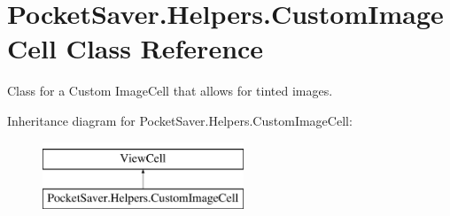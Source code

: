 \hypertarget{class_pocket_saver_1_1_helpers_1_1_custom_image_cell}{}\section{Pocket\+Saver.\+Helpers.\+Custom\+Image\+Cell Class Reference}
\label{class_pocket_saver_1_1_helpers_1_1_custom_image_cell}


Class for a Custom Image\+Cell that allows for tinted images.  


Inheritance diagram for Pocket\+Saver.\+Helpers.\+Custom\+Image\+Cell\+:\begin{figure}[H]
\begin{center}
\leavevmode
\includegraphics[height=2.000000cm]{class_pocket_saver_1_1_helpers_1_1_custom_image_cell}
\end{center}
\end{figure}
